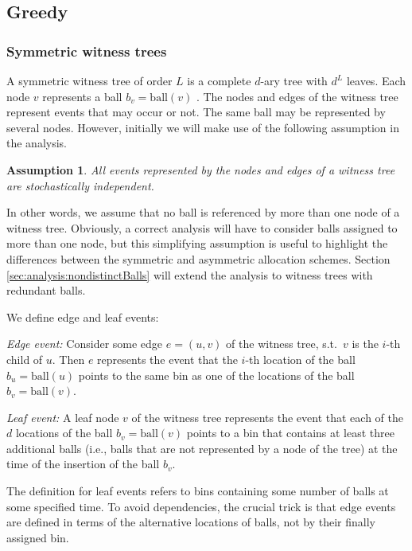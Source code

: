 \documentclass[a4paper,12pt]{article}
\newcommand\todo[1]{\textcolor{red}{(TODO: #1)}}
\newtheorem{assumption}{Assumption}
\begin{document}
\subsection{Greedy}
\label{sec:analysis:greedy}

\subsubsection{Symmetric witness trees}
\label{sec:analysis:definitionSymWT}
A symmetric witness tree of order $L$ is a complete $d$-ary tree with $d^{L}$ leaves. Each node $v$ represents a ball $b_v = \mathrm{ball}(v)$ . The nodes and edges of the witness tree represent events that may occur or not. The same ball may be represented by several nodes. However, initially we will make use of the following assumption in the analysis.
\begin{assumption}
\label{assumption:independence}
All events represented by the nodes and edges of a witness tree are stochastically independent. 
\end{assumption}
In other words, we assume that no ball is referenced by more than one node of a witness tree. Obviously, a correct analysis will have to consider balls assigned to more than one node, but this simplifying assumption is useful to highlight the differences between the symmetric and asymmetric allocation schemes. Section \ref{sec:analysis:nondistinctBalls} will extend the analysis to witness trees with redundant balls.

We define edge and leaf events:
\begin{compactitem}
\item \emph{Edge event:} Consider some edge $e = (u,v)$ of the witness tree, s.t.~$v$ is the $i$-th child of $u$. Then $e$ represents the event that the $i$-th location of the ball $b_u = \mathrm{ball}(u)$ points to the same bin as one of the locations of the ball $b_v = \mathrm{ball}(v)$. 
\item \emph{Leaf event:} A leaf node $v$ of the witness tree represents the event that each of the $d$ locations of the ball $b_v = \mathrm{ball}(v)$ points to a bin that contains at least three additional balls (i.e., balls that are not represented by a node of the tree) at the time of the insertion of the ball $b_v$.
\end{compactitem}
The definition for leaf events refers to bins containing some number of balls at some specified time. To avoid dependencies, the crucial trick is that edge events are defined in terms of the alternative locations of balls, not by their finally assigned bin. 
\end{document}
